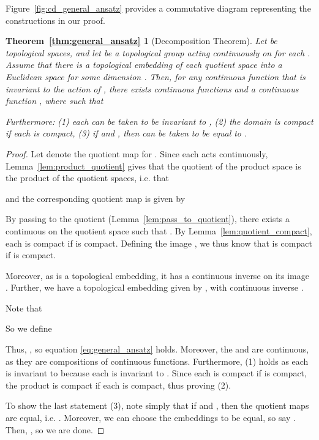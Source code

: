 \documentclass{article} \usepackage{iclr2023_conference,times}
\begin{document}
Figure~\ref{fig:cd_general_ansatz} provides a commutative diagram representing the constructions in our proof.
\newtheorem*{thm:general_ansatz}{Theorem~\ref{thm:general_ansatz}}
\begin{thm:general_ansatz}[Decomposition Theorem]
    Let  be  topological spaces, and let  be a topological group acting continuously on  for each . Assume that there is a topological embedding  of each quotient space into a Euclidean space  for some dimension . 
    Then, for any continuous function   that is invariant to the action of , there exists continuous functions  and a continuous function , where  such that
    
    Furthermore: (1) each  can be taken to be invariant to , (2) the domain  is compact if each  is compact, (3) if  and , then  can be taken to be equal to . 
\end{thm:general_ansatz}
\begin{proof}
    Let  denote the quotient map for . Since each  acts continuously, Lemma~\ref{lem:product_quotient} gives that the quotient of the product space is the product of the quotient spaces, i.e. that
    
    and the corresponding quotient map  is given by 
    
By passing to the quotient (Lemma~\ref{lem:pass_to_quotient}), there exists a continuous  on the quotient space such that . By Lemma~\ref{lem:quotient_compact}, each  is compact if  is compact. Defining the image , we thus know that  is compact if  is compact. 

Moreover, as  is a topological embedding, it has a continuous inverse  on its image . Further, we have a topological embedding  given by , with continuous inverse .

Note that

So we define

Thus, , so equation \eqref{eq:general_ansatz} holds. Moreover, the  and  are continuous, as they are compositions of continuous functions. Furthermore, (1) holds as each  is invariant to  because each  is invariant to .  Since each  is compact if  is compact, the product  is compact if each  is compact, thus proving (2).

To show the last statement (3), note simply that if  and , then the quotient maps are equal, i.e. . Moreover, we can choose the embeddings to be equal, so say . Then, , so we are done.
\end{proof}
\end{document}
